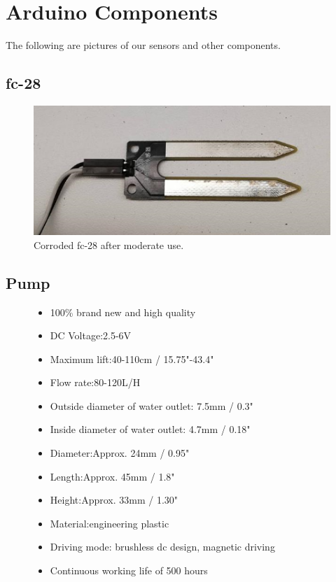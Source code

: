 \documentclass[a4paper,12pt,oneside,openright,titlepage]{book}
\begin{document}
\chapter{Arduino Components}
The following are pictures of our sensors and other components.

\section{fc-28}
\begin{figure}[!ht]
  \centering
      \includegraphics{fc-28-corrosion}
  \caption{Corroded fc-28 after moderate use.}
  \label{fig:resistive}
\end{figure}

\section{Pump}
\begin{figure}[ht!]
	\begin{itemize}
	\item 100\% brand new and high quality
	\item DC Voltage:2.5-6V
	\item Maximum lift:40-110cm / 15.75"-43.4"
	\item Flow rate:80-120L/H
	\item Outside diameter of water outlet: 7.5mm / 0.3"
	\item Inside diameter of water outlet: 4.7mm / 0.18"
	\item Diameter:Approx. 24mm / 0.95"
	\item Length:Approx. 45mm / 1.8"
	\item Height:Approx. 33mm / 1.30"
	\item Material:engineering plastic
	\item Driving mode: brushless dc design, magnetic driving
	\item Continuous working life of 500 hours
	\end{itemize}
	\label{fig:pump description}
\end{figure}
\end{document}
